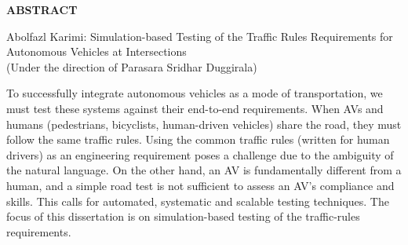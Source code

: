 
\begin{center}
\vspace*{52pt}
{\textbf{ABSTRACT}}
\vspace{11pt}

\begin{singlespace}
    Abolfazl Karimi: Simulation-based Testing of the Traffic Rules Requirements for Autonomous Vehicles at Intersections\\
(Under the direction of Parasara Sridhar Duggirala)
\end{singlespace}
\end{center}




To successfully integrate autonomous vehicles as a mode of transportation, we must test these systems against their end-to-end requirements.
%
When AVs and humans (pedestrians, bicyclists, human-driven vehicles) share the road, they must follow the same traffic rules.
%
Using the common traffic rules (written for human drivers) as an engineering requirement poses a challenge due to the ambiguity of the natural language.
%
On the other hand, an AV is fundamentally different from a human, and a simple road test is not sufficient to assess an AV's compliance and skills.
%
This calls for automated, systematic and scalable testing techniques.
%
The focus of this dissertation is on simulation-based testing of the traffic-rules requirements.


